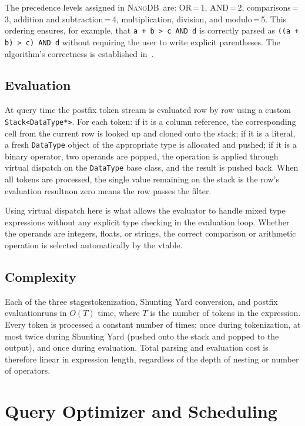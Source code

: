 \documentclass[conference]{IEEEtran}
\newcommand{\NanoDB}{\textsc{NanoDB}}
\newcommand{\code}[1]{\texttt{#1}}
\begin{document}
The precedence levels assigned in \NanoDB\ are: OR\,=\,1, AND\,=\,2,
comparisons\,=\,3, addition and subtraction\,=\,4, multiplication, division, and
modulo\,=\,5. This ordering ensures, for example, that \code{a + b > c AND d}
is correctly parsed as \code{((a + b) > c) AND d} without requiring the user to
write explicit parentheses. The algorithm's correctness is established
in~\cite{cormen2022}.

\subsection{Evaluation}

At query time the postfix token stream is evaluated row by row using a custom
\code{Stack<DataType*>}. For each token: if it is a column reference, the
corresponding cell from the current row is looked up and cloned onto the stack;
if it is a literal, a fresh \code{DataType} object of the appropriate type is
allocated and pushed; if it is a binary operator, two operands are popped, the
operation is applied through virtual dispatch on the \code{DataType} base class,
and the result is pushed back. When all tokens are processed, the single value
remaining on the stack is the row's evaluation resultnon zero means the row
passes the filter.

Using virtual dispatch here is what allows the evaluator to handle mixed type
expressions without any explicit type checking in the evaluation loop. Whether the
operands are integers, floats, or strings, the correct comparison or arithmetic
operation is selected automatically by the vtable.

\subsection{Complexity}

Each of the three stagestokenization, Shunting Yard conversion, and postfix
evaluationruns in $O(T)$ time, where $T$ is the number of tokens in the
expression. Every token is processed a constant number of times: once during
tokenization, at most twice during Shunting Yard (pushed onto the stack and
popped to the output), and once during evaluation. Total parsing and evaluation
cost is therefore linear in expression length, regardless of the depth of
nesting or number of operators.

\section{Query Optimizer and Scheduling}
\end{document}
